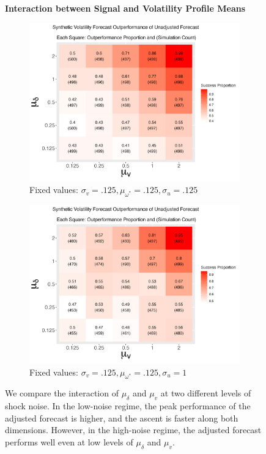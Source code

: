 \documentclass[11pt,3p,review,authoryear]{elsarticle}
\theoremstyle{definition}
\begin{document}
  \begin{figure}[!h]
    \centering
    \textbf{Interaction between Signal and Volatility Profile Means}\par\medskip
  \begin{subfigure}{.44\linewidth} 
    \centering
      \includegraphics[scale = .42]{simulation_plots/Jul01_192528_2024_mu[delta]_mu[v].png}
      \caption{Fixed values: $\sigma_{v} = .125, \mu_{\omega^{*}} = .125, \sigma_{u} = .125$}\label{fig:sim_4}
  \end{subfigure}\hspace{12mm} %
  \begin{subfigure}{.44\linewidth} 
    \centering
      \includegraphics[scale=.42]{simulation_plots/Jul01_192539_2024_mu[delta]_mu[v].png}
      \caption{Fixed values: $\sigma_{v} = .125, \mu_{\omega^{*}} = .125, \sigma_{u} = 1$}\label{fig:sim_5}
  \end{subfigure}
  
      \caption{We compare the interaction of $\mu_{\delta}$ and $\mu_{v}$ at two different levels of shock noise.  In the low-noise regime, the peak performance of the adjusted forecast is higher, and the ascent is faster along both dimensions.   However, in the high-noise regime, the adjusted forecast performs well even at low levels of $\mu_{\delta}$ and $\mu_{v}$.}
      \label{fig:sig_volprof}
    \end{figure}
\end{document}
